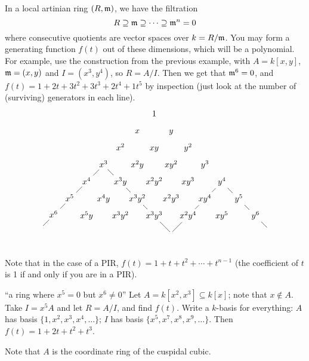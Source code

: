  \begin{example}
   In a local artinian ring $(R,\mathfrak{m})$, we have the filtration
   \[
    R\supseteq \mathfrak{m}\supseteq \cdots \supseteq \mathfrak{m}^n=0
   \]
   where consecutive quotients are vector spaces over $k=R/\mathfrak{m}$. You may form a generating
   function $f(t)$ out of these dimensions, which will be a polynomial. For example, use
   the construction from the previous example, with $A=k[x,y]$, $\mathfrak{m}=(x,y)$ and
   $I=(x^3,y^4)$, so $R=A/I$. Then we get that $\mathfrak{m}^6=0$, and
   $f(t)=1+2t+3t^2+3t^3+2t^4+1t^5$ by inspection (just look at the number of (surviving)
   generators in each line).
   \[\xymatrix @dr @R=.5pc @C=.5pc{
      1 & y & y^2 & y^3 & y^4 \ar@{-}[d] \ar@{-}[r] & y^5 \ar@{-}[r]& y^6\ar@{-}[r] & \\
      x & xy & xy^2 & xy^3 & xy^4 \ar@{-}[d] & xy^5\\
      x^2 & x^2y & x^2y^2 & x^2y^3 & x^2y^4 \ar@{-}[d] \\
      x^3 \ar@{-}[r] \ar@{-}[d] & x^3y \ar@{-}[r]& x^3y^2 \ar@{-}[r]& x^3y^3 \ar@{-}[r]&\\
      x^4 \ar@{-}[d]& x^4y & x^3y^2\\
      x^5 \ar@{-}[d]& x^5y\\
      x^6 \ar@{-}[d]\\
      &
   }\]

   Note that in the case of a PIR, $f(t)=1+t+t^2+\cdots+t^{n-1}$ (the coefficient of $t$
   is 1 if and only if you are in a PIR).
 \end{example}
 \begin{example}
   ``a ring where $x^5=0$ but $x^6\neq 0$'' Let $A=k[x^2,x^3]\subseteq k[x]$; note that
   $x\not\in A$. Take $I=x^5 A$ and let $R=A/I$, and find $f(t)$. Write a $k$-basis for
   everything: $A$ has basis $\{1,x^2,x^3,x^4,\dots\}$; $I$ has basis
   $\{x^5,x^7,x^8,x^9,\dots\}$. Then $f(t)=1+2t+t^2+t^3$.

   Note that $A$ is the coordinate ring of the cuspidal cubic.
 \end{example}
